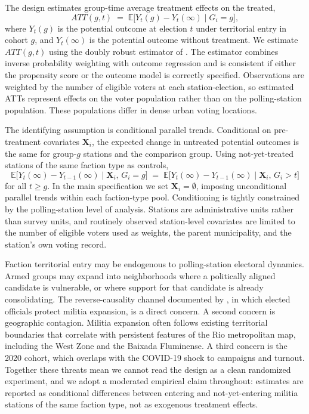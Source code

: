 \documentclass[11pt]{article}
\begin{document}
The design estimates group-time average treatment effects on the treated,
\begin{equation}\label{eq:att_gt}
ATT(g,t) \;=\; \mathbb{E}\!\big[Y_t(g) - Y_t(\infty) \mid G_i = g\big],
\end{equation}
where $Y_t(g)$ is the potential outcome at election $t$ under territorial entry in cohort $g$, and $Y_t(\infty)$ is the potential outcome without treatment. We estimate $ATT(g,t)$ using the doubly robust estimator of \citet{callaway2021did}. The estimator combines inverse probability weighting with outcome regression and is consistent if either the propensity score or the outcome model is correctly specified. Observations are weighted by the number of eligible voters at each station-election, so estimated ATTs represent effects on the voter population rather than on the polling-station population. These populations differ in dense urban voting locations.

The identifying assumption is conditional parallel trends. Conditional on pre-treatment covariates $\mathbf{X}_i$, the expected change in untreated potential outcomes is the same for group-$g$ stations and the comparison group. Using not-yet-treated stations of the same faction type as controls,
\begin{equation}\label{eq:cpt}
\mathbb{E}\!\big[Y_t(\infty) - Y_{t-1}(\infty) \mid \mathbf{X}_i,\, G_i = g\big]
  \;=\;
\mathbb{E}\!\big[Y_t(\infty) - Y_{t-1}(\infty) \mid \mathbf{X}_i,\, G_i > t\big]
\end{equation}
for all $t \geq g$. In the main specification we set $\mathbf{X}_i = \emptyset$, imposing unconditional parallel trends within each faction-type pool. Conditioning is tightly constrained by the polling-station level of analysis. Stations are administrative units rather than survey units, and routinely observed station-level covariates are limited to the number of eligible voters used as weights, the parent municipality, and the station's own voting record.

Faction territorial entry may be endogenous to polling-station electoral dynamics. Armed groups may expand into neighborhoods where a politically aligned candidate is vulnerable, or where support for that candidate is already consolidating. The reverse-causality channel documented by \citet{pantaleao2025elections}, in which elected officials protect militia expansion, is a direct concern. A second concern is geographic contagion. Militia expansion often follows existing territorial boundaries that correlate with persistent features of the Rio metropolitan map, including the West Zone and the Baixada Fluminense. A third concern is the 2020 cohort, which overlaps with the COVID-19 shock to campaigns and turnout. Together these threats mean we cannot read the design as a clean randomized experiment, and we adopt a moderated empirical claim throughout: estimates are reported as conditional differences between entering and not-yet-entering militia stations of the same faction type, not as exogenous treatment effects.
\end{document}

